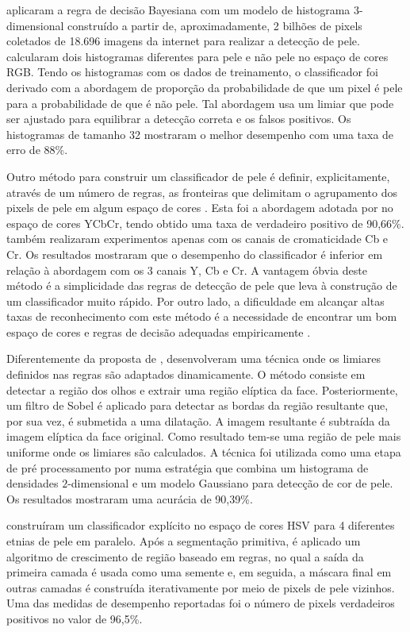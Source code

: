 \citet{jones:02} aplicaram a regra de decisão Bayesiana com um modelo de histograma $3$-dimensional construído a partir de, aproximadamente, 2 bilhões de pixels coletados de 18.696 imagens da internet para realizar a detecção de pele. \citet{jones:02} calcularam dois histogramas diferentes para pele e não pele no espaço de cores RGB. Tendo os histogramas com os dados de treinamento, o classificador foi derivado com a abordagem de proporção da probabilidade de que um pixel é pele para a probabilidade de que é não pele. Tal abordagem usa um limiar que pode ser ajustado para equilibrar a detecção correta e os falsos positivos. Os histogramas de tamanho 32 mostraram o melhor desempenho com uma taxa de erro de 88\%.

Outro método para construir um classificador de pele é definir, explicitamente, através de um número de regras, as fronteiras que delimitam o agrupamento dos pixels de pele em algum espaço de cores \citep{vezhnevets:03}. Esta foi a abordagem adotada por \citet{kovac:03} no espaço de cores YCbCr, tendo obtido uma taxa de verdadeiro positivo de 90,66\%. \citet{kovac:03} também realizaram experimentos apenas com os canais de cromaticidade Cb e Cr. Os resultados mostraram que o desempenho do classificador é inferior em relação à abordagem com os 3 canais Y, Cb e Cr. A vantagem óbvia deste método é a simplicidade das regras de detecção de pele que leva à construção de um classificador muito rápido. Por outro lado, a dificuldade em alcançar altas taxas de reconhecimento com este método é a necessidade de encontrar um bom espaço de cores e regras de decisão adequadas empiricamente \citep{vezhnevets:03}.

Diferentemente da proposta de \citet{kovac:03}, \citet{yogarajah:11} desenvolveram uma técnica onde os limiares definidos nas regras são adaptados dinamicamente. O método consiste em detectar a região dos olhos e extrair uma região elíptica da face. Posteriormente, um filtro de Sobel é aplicado para detectar as bordas da região resultante que, por sua vez, é submetida a uma dilatação. A imagem resultante é subtraída da imagem elíptica da face original. Como resultado tem-se uma região de pele mais uniforme onde os limiares são calculados. A técnica foi utilizada como uma etapa de pré processamento por \citet{tan:12} numa estratégia que combina um histograma de densidades $2$-dimensional e um modelo Gaussiano para detecção de cor de pele. Os resultados mostraram uma acurácia de 90,39\%.

\citet{naji:12} construíram um classificador explícito no espaço de cores HSV para 4 diferentes etnias de pele em paralelo. Após a segmentação primitiva, é aplicado um algoritmo de crescimento de região baseado em regras, no qual a saída da primeira camada é usada como uma semente e, em seguida, a máscara final em outras camadas é construída iterativamente por meio de pixels de pele vizinhos. Uma das medidas de desempenho reportadas foi o número de pixels verdadeiros positivos no valor de 96,5\%.

